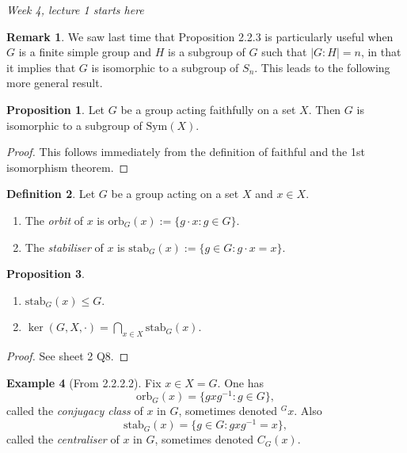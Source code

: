 \documentclass[a4paper]{article}
\newcommand{\orb}{\text{orb}}
\newcommand{\stab}{\text{stab}}
\newcommand{\Sym}{\text{Sym}}
\theoremstyle{definition}
\newtheorem{defn}{Definition}[subsection]
\newtheorem{prop}[defn]{Proposition}
\newtheorem{example}[defn]{Example}
\newtheorem*{remark}{Remark}
\begin{document}
\begin{flushright}
\textit{Week 4, lecture 1 starts here}
\end{flushright}

\begin{remark}
We saw last time that Proposition 2.2.3 is particularly useful when $G$ is a finite simple group and $H$ is a subgroup of $G$ such that $|G:H|=n$, in that it implies that $G$ is isomorphic to a subgroup of $S_n$. This leads to the following more general result.
\end{remark}

\begin{prop}
Let $G$ be a group acting faithfully on a set $X$. Then $G$ is isomorphic to a subgroup of $\Sym(X)$.
\end{prop}
\begin{proof}
This follows immediately from the definition of faithful and the 1st isomorphism theorem.
\end{proof}

\begin{defn}
Let $G$ be a group acting on a set $X$ and $x\in X$.
\begin{enumerate}
\item The \textit{orbit} of $x$ is $\orb_G(x):=\{g\cdot x:g\in G\}$.
\item The \textit{stabiliser} of $x$ is $\stab_G(x):=\{g\in G:g\cdot x=x\}$.
\end{enumerate}
\end{defn}

\begin{prop}
\begin{enumerate}
\item $\stab_G(x)\leq G$.
\item $\displaystyle \ker (G,X,\cdot)=\bigcap_{x\in X} \stab_G(x)$.
\end{enumerate}
\end{prop}
\begin{proof}
See sheet 2 Q8.
\end{proof}

\begin{example}[From 2.2.2.2]
Fix $x\in X=G$. One has
\[
\orb_G(x)=\{gxg^{-1}:g\in G\},
\]
called the \textit{conjugacy class} of $x$ in $G$, sometimes denoted $^G x$. Also
\[
\stab_G(x)=\{g\in G:gxg^{-1}=x\},
\]
called the \textit{centraliser} of $x$ in $G$, sometimes denoted $C_G(x)$.
\end{example}
\end{document}
